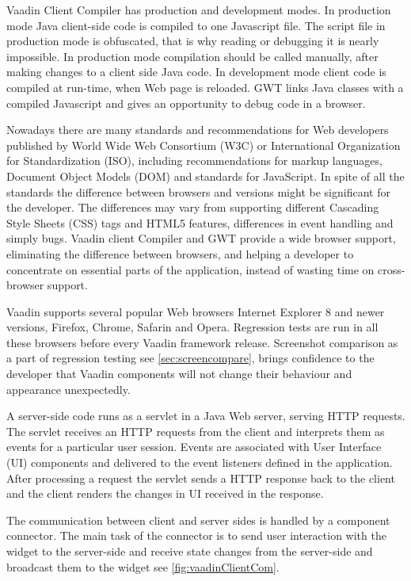    Vaadin Client Compiler has production and development modes. 
   In production mode Java  client-side code is compiled to one Javascript file. The script file in
   production mode is obfuscated, that is why reading or debugging it is nearly
   impossible. In production mode compilation should be called manually,
   after making changes to a client side Java code.
   In development mode client code is compiled at run-time, when Web page
   is reloaded. GWT links Java classes  with a compiled Javascript and gives
   an opportunity to debug code in a browser.
  
   Nowadays there are many standards and recommendations for Web
   developers published by World Wide Web Consortium (W3C) or  International
   Organization for Standardization (ISO), including recommendations for
   markup languages, Document Object Models (DOM) and standards
   for JavaScript. In spite of all the standards the difference between browsers
   and versions might be significant for the developer. The differences may vary
   from supporting different Cascading Style Sheets (CSS) tags
   and HTML5 features, differences in event handling and simply bugs. Vaadin
   client Compiler and GWT provide a wide browser support, eliminating the difference between browsers, and helping a
   developer to concentrate on essential parts of the application, instead of
   wasting time on cross-browser support. 
   
   Vaadin supports several popular Web browsers Internet Explorer 8 and newer
   versions, Firefox, Chrome, Safarin and Opera. Regression tests are run
   in all these browsers before every Vaadin framework release. Screenshot
   comparison as a part of regression testing see \ref{sec:screencompare},
   brings confidence to the developer that Vaadin components will not change
   their behaviour and appearance unexpectedly.
   
   A server-side code runs as a servlet in a Java Web server, serving HTTP
   requests. The servlet receives an HTTP requests from the client and
   interprets them as events for a particular user session.
   Events are associated with User Interface (UI) components and delivered to
   the event listeners defined in the application. After processing a request
   the servlet sends a HTTP response back to the client and the client renders
   the changes in UI received in the response.
   
   The communication between client and server sides is handled by a component
   connector. The main task of the connector is to send user interaction
   with the widget to the server-side and receive state changes from the server-side 
   and broadcast them to the widget see \ref{fig:vaadinClientCom}. 
    
